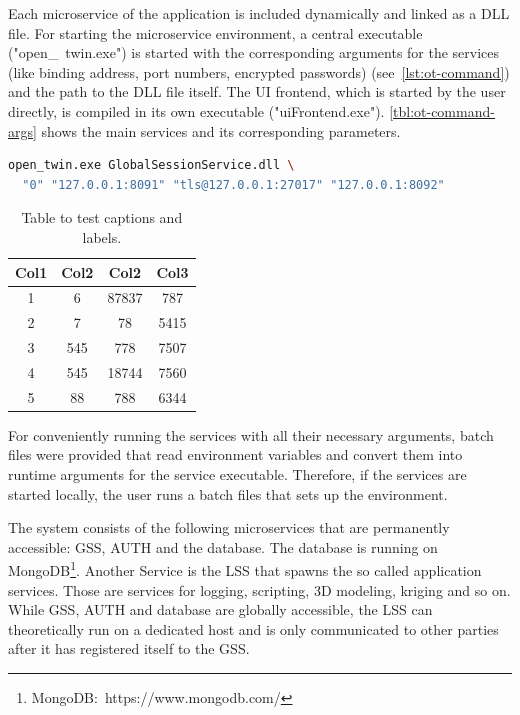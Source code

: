 Each microservice of the application is included dynamically and linked as a \ac{DLL} file. For starting the microservice environment, a central executable ("open\_\ twin.exe") is started with the corresponding arguments for the services (like binding address, port numbers, encrypted passwords) (see~\autoref{lst:ot-command}) and the path to the \ac{DLL} file itself. The UI frontend, which is started by the user directly, is compiled in its own executable ("uiFrontend.exe"). \autoref{tbl:ot-command-args} shows the main services and its corresponding parameters.

\begin{lstlisting}[language=sh, caption={Command line of Open Twin Service start}, label=lst:ot-command]
open_twin.exe GlobalSessionService.dll \
  "0" "127.0.0.1:8091" "tls@127.0.0.1:27017" "127.0.0.1:8092"
\end{lstlisting}

\begin{table}[h!]
	\centering
	\begin{tabular}{||c c c c||} 
		\hline
		Col1 & Col2 & Col2 & Col3 \\ [0.5ex] 
		\hline\hline
		1 & 6 & 87837 & 787 \\ 
		2 & 7 & 78 & 5415 \\
		3 & 545 & 778 & 7507 \\
		4 & 545 & 18744 & 7560 \\
		5 & 88 & 788 & 6344 \\ [1ex] 
		\hline
	\end{tabular}
	\caption{Table to test captions and labels.}
	\label{tbl:ot-command-args}
\end{table}

For conveniently running the services with all their necessary arguments, batch files were provided that read environment variables and convert them into runtime arguments for the service executable. Therefore, if the services are started locally, the user runs a batch files that sets up the environment.

The system consists of the following microservices that are permanently accessible: \ac{GSS}, \ac{AUTH} and the database. The database is running on MongoDB\footnote{MongoDB:~https://www.mongodb.com/}. Another Service is the \ac{LSS} that spawns the so called application services. Those are services for logging, scripting, 3D modeling, kriging and so on.
While \ac{GSS}, \ac{AUTH} and database are globally accessible, the \ac{LSS} can theoretically run on a dedicated host and is only communicated to other parties after it has registered itself to the \ac{GSS}.

